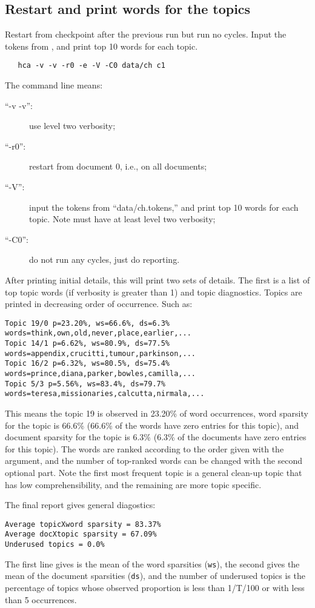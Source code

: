 \documentclass[a4paper,english]{article}
\begin{document}
\subsection{Restart and print words for the topics}
Restart from checkpoint after the previous run but run no cycles.
Input the tokens from
, and print top 10 words for each topic.
\begin{verbatim}
   hca -v -v -r0 -e -V -C0 data/ch c1
\end{verbatim}
The command line means:
\begin{description}
\item[``-v -v'':] use level two verbosity;
\item[``-r0'':] restart from document 0, i.e., on all documents;
\item[``-V'':] input the tokens from
``data/ch.tokens,'' and print top 10 words for each topic.
Note must have at least level two verbosity;
\item[``-C0'':] do not run any cycles, just do reporting.
\end{description}
After printing initial details, this will print two
sets of details.
The first is a list of top topic words (if verbosity is greater than 1)
and topic diagnostics. 
Topics are printed in decreasing order of occurrence.
Such as:
\begin{verbatim}
Topic 19/0 p=23.20%, ws=66.6%, ds=6.3% words=think,own,old,never,place,earlier,...
Topic 14/1 p=6.62%, ws=80.9%, ds=77.5% words=appendix,crucitti,tumour,parkinson,...
Topic 16/2 p=6.32%, ws=80.5%, ds=75.4% words=prince,diana,parker,bowles,camilla,...
Topic 5/3 p=5.56%, ws=83.4%, ds=79.7% words=teresa,missionaries,calcutta,nirmala,...
\end{verbatim}
This means the topic 19 is observed in 23.20\% of word occurrences,
word sparsity for the topic is 66.6\%
(66.6\% of the words have zero entries for this topic),
and document sparsity for the topic is 6.3\%
(6.3\% of the documents have zero entries for this topic).
The words are ranked according to the order given with the  argument,
and the number of top-ranked words can be changed with the 
second optional part.
Note the first most frequent topic is a general clean-up topic that
has low comprehensibility, and the remaining are more topic specific.

The final report gives general diagostics:
\begin{verbatim}
Average topicXword sparsity = 83.37%
Average docXtopic sparsity = 67.09%
Underused topics = 0.0%
\end{verbatim}
The first line gives is the mean of the word sparsities
(\texttt{ws}), the second 
gives the mean of the document sparsities (\texttt{ds}),
and the number of underused topics is the
percentage of topics whose observed proportion
is less than 1/T/100 or with less than 5 occurrences.
\end{document}
